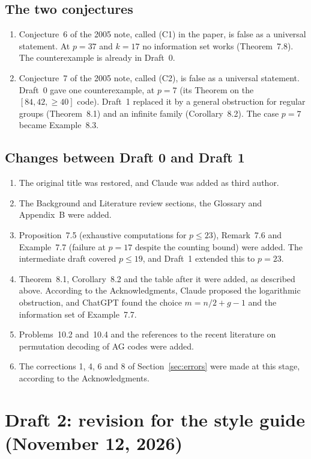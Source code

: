 \documentclass[12pt,letterpaper]{article}
\begin{document}
\subsection{The two conjectures}
\begin{enumerate}
\item Conjecture~6 of the 2005 note, called (C1) in the paper, is false as a
universal statement. At $p=37$ and $k=17$ no information set works
(Theorem~7.8). The counterexample is already in Draft~0.
\item Conjecture~7 of the 2005 note, called (C2), is false as a universal
statement. Draft~0 gave one counterexample, at $p=7$ (its Theorem on the
$[84,42,\ge40]$ code). Draft~1 replaced it by a general obstruction for regular
groups (Theorem~8.1) and an infinite family (Corollary~8.2). The case $p=7$
became Example~8.3.
\end{enumerate}

\subsection{Changes between Draft 0 and Draft 1}
\begin{enumerate}
\item The original title was restored, and Claude was added as third author.
\item The Background and Literature review sections, the Glossary and
Appendix~B were added.
\item Proposition~7.5 (exhaustive computations for $p\le23$), Remark~7.6 and
Example~7.7 (failure at $p=17$ despite the counting bound) were added. The
intermediate draft covered $p\le19$, and Draft~1 extended this to $p=23$.
\item Theorem~8.1, Corollary~8.2 and the table after it were added, as described
above. According to the Acknowledgments, Claude proposed the logarithmic
obstruction, and ChatGPT found the choice $m=n/2+g-1$ and the information set of
Example~7.7.
\item Problems~10.2 and~10.4 and the references to the recent literature on
permutation decoding of AG codes were added.
\item The corrections 1, 4, 6 and 8 of Section~\ref{sec:errors} were made at this
stage, according to the Acknowledgments.
\end{enumerate}

\section{Draft 2: revision for the style guide (November 12, 2026)}
\label{sec:draft2}
\end{document}
